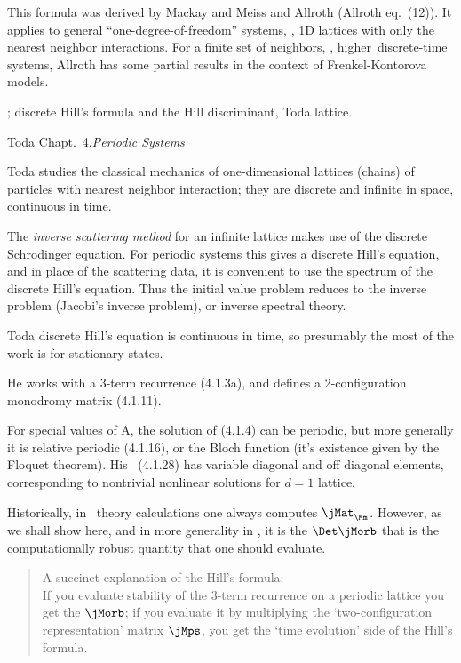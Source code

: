 This formula was derived by Mackay and Meiss and
Allroth (Allroth eq.~(12)). It applies to general
``one-degree-of-freedom'' systems, \ie, 1D lattices with only the nearest
neighbor interactions. For a finite set of neighbors, \ie, higher\dmn\
discrete-time systems, Allroth has some partial results in the
context of Frenkel-Kontorova models.

{\HillDet};
discrete Hill's formula and the Hill discriminant, Toda lattice.

Toda %
Chapt.~4.{\em Periodic Systems}

Toda studies the classical mechanics of one-dimensional
lattices (chains) of particles with nearest neighbor interaction; they
are discrete and infinite in space, continuous in time.

The {\em inverse scattering method} for an infinite lattice makes use of
the discrete Schrodinger equation. For periodic systems this gives a
discrete Hill's equation, and in place of the scattering data, it is
convenient to use the spectrum of the discrete Hill's equation.
 Thus the initial value problem reduces to the inverse problem
(Jacobi's inverse problem), or inverse spectral theory.

Toda discrete Hill's equation is continuous in time, so presumably the most
of the work is for stationary states.

He works with a 3-term recurrence (4.1.3a), and defines a 2-configuration
monodromy matrix (4.1.11).

For special values of A, the solution of (4.1.4) can be periodic, but
more generally it is relative periodic (4.1.16), or the Bloch function
(it's existence given by the Floquet theorem).
His \jacobianOrb\ (4.1.28) has variable diagonal and off
diagonal elements, corresponding to nontrivial nonlinear solutions for
$d=1$ lattice.

Historically,  in \po\ theory
calculations one always computes $\jMat_\Mm$. However, as we shall show
here, and in more generality in \refsect{s:Hill}, it is the {\HillDet}
$\Det\jMorb$ that is the computationally robust quantity that one should
evaluate.

\begin{quote}
A succinct  explanation of the Hill's formula:\\
If you evaluate stability of the 3-term recurrence  on
a periodic lattice you get the {\jacobianOrb} $\jMorb$;
if you evaluate it by multiplying the `two-configuration representation'
matrix $\jMps$, you get the `time evolution' side of the Hill's formula.
\end{quote}


